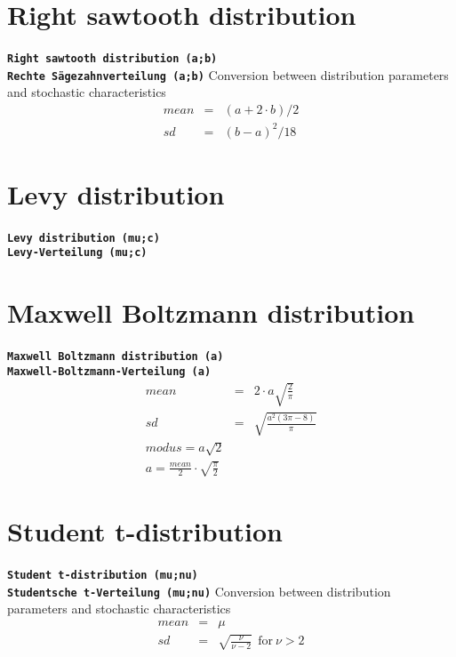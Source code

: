 \documentclass{svmono}
\def\cm#1{\textbf{\texttt{#1}}}
\begin{document}
\section*{Right sawtooth distribution}
\cm{Right sawtooth distribution (a;b)}~\\
\cm{Rechte Sägezahnverteilung (a;b)}
Conversion between distribution parameters and stochastic characteristics
\begin{eqnarray*}
mean&=&(a+2\cdot b)/2\\
sd&=&(b-a)^2/18
\end{eqnarray*}





\section*{Levy distribution}
\cm{Levy distribution (mu;c)}~\\
\cm{Levy-Verteilung (mu;c)}





\section*{Maxwell Boltzmann distribution}
\cm{Maxwell Boltzmann distribution (a)}~\\
\cm{Maxwell-Boltzmann-Verteilung (a)}
\begin{eqnarray*}
mean&=&2\cdot a\sqrt{\frac{2}{\pi}}\\
sd&=&\sqrt{\frac{a^2(3\pi-8)}{\pi}}\\
modus=a\sqrt{2}\\
a=\frac{mean}{2}\cdot\sqrt{\frac{\pi}{2}}
\end{eqnarray*}





\section*{Student t-distribution}
\cm{Student t-distribution (mu;nu)}~\\
\cm{Studentsche t-Verteilung (mu;nu)}
Conversion between distribution parameters and stochastic characteristics
\begin{eqnarray*}
mean&=&\mu\\
sd&=&\sqrt{\frac{\nu}{\nu-2}}~~\textrm{for}~\nu>2
\end{eqnarray*}
\end{document}
